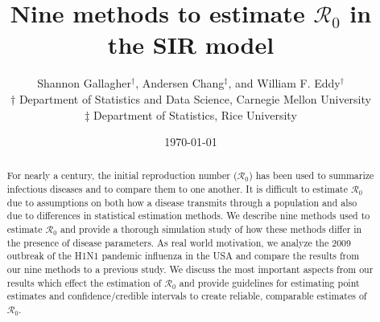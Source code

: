 \documentclass[12pt]{article}
\newcommand{\Wxxsir}{Nine } %
\newcommand{\rr}{\ensuremath{\mathcal{R}_0}}
\begin{document}




\title{\Wxxsir methods to estimate $\rr$ in the SIR model}
\author{ Shannon Gallagher$^{\dag}$, Andersen Chang$^{\ddag}$, and William F. Eddy$^{\dag}$ \\$\dag$ Department of Statistics and Data Science, Carnegie Mellon University\\ $\ddag$ Department of Statistics, Rice University}
\date{\today}
\maketitle

\begin{abstract}
For nearly a century, the initial reproduction number ($\rr$) has been used to summarize infectious diseases and to compare them to one another.  It is difficult to estimate $\rr$ due to assumptions on both how a disease transmits through a population and also due to differences in statistical estimation methods.  We describe nine methods used to estimate $\rr$ and provide a thorough simulation study of how these methods differ in the presence of disease parameters.  As real world motivation, we analyze the 2009 outbreak of the H1N1 pandemic influenza in the USA and compare the results from our nine methods to a previous study.  We discuss the most important aspects from our results which effect the estimation of $\rr$ and provide guidelines for estimating point estimates and confidence/credible intervals to create reliable, comparable estimates of $\rr$.
  \end{abstract}
\end{document}
